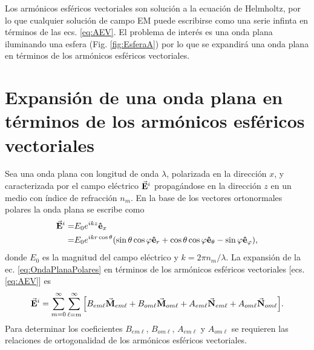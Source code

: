\documentclass[letterpaper,11pt] {article}
\newcommand{\ex}{\ensuremath{\vu{e}_x}}
\newcommand{\er}{\ensuremath{\vu{e}_r}}
\newcommand{\etheta}{\ensuremath{\vu{e}_\theta}}
\newcommand{\ephi}{\ensuremath{\vu{e}_\varphi}}
\begin{document}
Los armónicos esféricos vectoriales son solución a la ecuación de Helmholtz, por lo que cualquier solución de campo EM puede escribirse como una serie infinta en términos de las ecs. \eqref{eq:AEV}. El problema de interés es una onda plana iluminando una esfera (Fig. \ref{fig:EsferaA}) por lo que se expandirá una onda plana en términos de los armónicos esféricos vectoriales.

\section{Expansión de una onda plana en términos de los armónicos esféricos vectoriales}

	Sea una onda plana con longitud de onda $\lambda$, polarizada en la dirección $x$, y caracterizada por el campo eléctrico $\va{E}^i$ propagándose en la dirección $z$ en un medio con índice de refracción $n_m$. En la base de los vectores ortonormales polares la onda plana se escribe como
	\begin{align}
	\va{E}^i =& E_0 e^{ikz}\ex \notag\\
			 =& E_0 e^{ikr\cos\theta} \qty(\sin\theta\cos\varphi \er + 
	\cos\theta\cos\varphi\etheta-\sin\varphi\ephi),\label{eq:OndaPlanaPolares}
	\end{align}
donde $E_0$ es la magnitud del campo eléctrico y $k=2\pi n_m/\lambda$. La expansión de la ec. \eqref{eq:OndaPlanaPolares} en términos de los armónicos esféricos vectoriales [ecs. \eqref{eq:AEV}] es
	\begin{equation}
	\va{E}^i = \sum_{m=0}^\infty\sum_{\ell=m}^\infty
			\qty[B_{em\ell}\va{M}_{em\ell} + B_{om\ell}\va{M}_{om\ell} +
				A_{em\ell}\va{N}_{em\ell} + A_{om\ell}\va{N}_{om\ell}].\label{eq:OndaPlanaAEV}
	\end{equation}
Para determinar los coeficientes $B_{em\ell},\, B_{om\ell},\, A_{em\ell}$ y $ A_{om\ell}$ se requieren las relaciones de ortogonalidad de los armónicos esféricos vectoriales.\\
\end{document}
